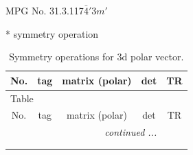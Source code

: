 \documentclass[fleqn,8pt]{jsarticle}
\begin{document}
\setcounter{MaxMatrixCols}{32}

\renewcommand{\tablename}{Table~}
\renewcommand{\figurename}{Figure~}
\begin{center}
\LARGE
MPG No. 31.3.117\quad$\bar{4}'3m'$
\end{center}
* symmetry operation
\renewcommand{\arraystretch}{1.3}
\begin{longtable}{ccccc}
\caption{Symmetry operations for 3d polar vector.}
 \\
 \hline \hline
No. & tag & matrix (polar) & det & TR \\ \hline \endfirsthead

\multicolumn{4}{l}{\tablename\ \thetable{}} \\
 \hline \hline
No. & tag & matrix (polar) & det & TR \\ \hline \endhead

 \hline \hline
\multicolumn{4}{r}{\footnotesize\it continued ...} \\ \endfoot

 \hline \hline
\multicolumn{4}{r}{} \\ \endlastfoot


\end{longtable}
\end{document}
